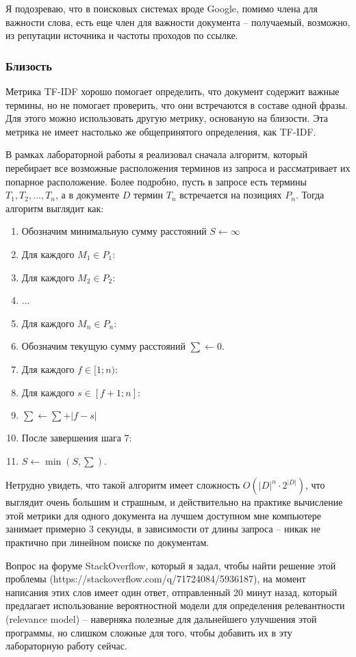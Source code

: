 \documentclass[a4page]{article}
\let\Oldsubsubsection\subsubsection
\renewcommand{\subsubsection}{\FloatBarrier\Oldsubsubsection}
\begin{document}
Я подозреваю, что в поисковых системах вроде Google, помимо члена для важности слова, есть еще член для важности документа -- получаемый, возможно, из репутации источника и частоты проходов по ссылке. 

\subsubsection{Близость}
Метрика TF-IDF хорошо помогает определить, что документ содержит важные термины, но не помогает проверить, что они встречаются в составе одной фразы. Для этого можно использовать другую метрику, основаную на близости. Эта метрика не имеет настолько же общепринятого определения, как TF-IDF.

В рамках лабораторной работы я реализовал сначала алгоритм, который перебирает все возможные расположения терминов из запроса и рассматривает их попарное расположение. Более подробно, пусть в запросе есть термины $T_1, T_2, ..., T_n$, а в документе $D$ термин $T_n$ встречается на позициях $P_n$. Тогда алгоритм выглядит как:

\begin{enumerate}
\item Обозначим минимальную сумму расстояний $S \leftarrow \infty$
\item Для каждого $M_1 \in P_1$:
\item Для каждого $M_2 \in P_2$: 
\item ...
\item Для каждого $M_n \in P_n$:
\item Обозначим текущую сумму расстояний $\sum \leftarrow 0$.
\item Для каждого $f \in [1; n)$:
\item Для каждого $s \in [f+1; n]$:
\item $\sum \leftarrow \sum + \left|f - s\right|$
\item После завершения шага 7: 
\item $S \leftarrow \min (S, \sum)$.
\end{enumerate}

Нетрудно увидеть, что такой алгоритм имеет сложность $O(|D|^n \cdot 2^{|D|})$, что выглядит очень большим и страшным, и действительно на практике вычисление этой метрики для одного документа на лучшем доступном мне компьютере занимает примерно 3 секунды, в зависимости от длины запроса -- никак не практично при линейном поиске по документам.

Вопрос на форуме StackOverflow, который я задал, чтобы найти решение этой проблемы (https://stackoverflow.com/q/71724084/5936187), на момент написания этих слов имеет один ответ, отправленный 20 минут назад, который предлагает использование вероятностной модели для определения релевантности (relevance model) -- наверняка полезные для дальнейшего улучшения этой программы, но слишком сложные для того, чтобы добавить их в эту лабораторную работу сейчас.
\end{document}

